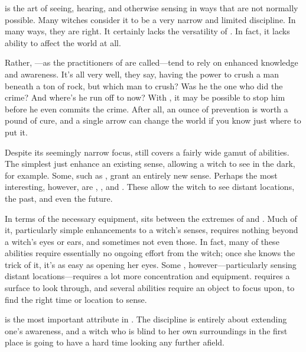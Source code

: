 
 is the art of seeing, hearing, and otherwise sensing in ways that are not normally possible.
Many witches consider it to be a very narrow and limited discipline.
In many ways, they are right.
It certainly lacks the versatility of .
In fact, it lacks  ability to affect the world at all.

Rather, ---as the practitioners of  are called---tend to rely on enhanced knowledge and awareness.
It's all very well, they say, having the power to crush a man beneath a ton of rock, but which man to crush?
Was he the one who did the crime?
And where's he run off to now?
With {\foretelling}, it may be possible to stop him before he even commits the crime.
After all, an ounce of prevention is worth a pound of cure, and a single arrow can change the world if you know just where to put it.

Despite its seemingly narrow focus,  still covers a fairly wide gamut of abilities.
The simplest just enhance an existing sense, allowing a witch to see in the dark, for example.
Some, such as , grant an entirely new sense.
Perhaps the most interesting, however, are , , and .
These allow the witch to see distant locations, the past, and even the future.

In terms of the necessary equipment,  sits between the extremes of  and .
Much of it, particularly simple enhancements to a witch's senses, requires nothing beyond a witch's eyes or ears, and sometimes not even those.
In fact, many of these abilities require essentially no ongoing effort from the witch; once she knows the trick of it, it's as easy as opening her eyes.
Some , however---particularly sensing distant locations---requires a lot more concentration and equipment.
 requires a surface to look through, and several abilities require an object to focus upon, to find the right time or location to sense.

 is the most important attribute in .
The discipline is entirely about extending one's awareness, and a witch who is blind to her own surroundings in the first place is going to have a hard time looking any further afield.

